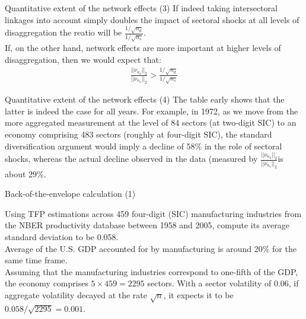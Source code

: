 \documentclass[dvipsnames]{beamer}
\begin{document}
\begin{frame}{Quantitative extent of the network effects (3)}
    \justifying
    If indeed taking intersectoral linkages into account
    simply doubles the impact of sectoral shocks at all levels of disaggregation
    the reatio will be  $\frac{1/\sqrt{n_d}}{1/\sqrt{n_s}}$.\\[5pt]

    If, on the other hand, network effects are more important at higher 
    levels of disaggregation, then we would expect that:
    \begin{align*}
        \frac{||\nu_{n_d}||_2}{||\nu_{n_s}||_2}>\frac{1/\sqrt{n_d}}{1/\sqrt{n_s}}
    \end{align*}


\end{frame}
\begin{frame}{Quantitative extent of the network effects (4)}
    \justifying
    The table early shows that the latter is indeed the case for all years. 
    For example, in 1972, as we move
    from the more aggregated measurement at the level of 84 sectors (at two-digit
    SIC) to an economy comprising 483 sectors (roughly at four-digit SIC), the
    standard diversification argument would imply a decline of 58\% in the role of
    sectoral shocks, whereas the actual decline observed in the data (measured by
    $\frac{||\nu_{n_d}||_2}{||\nu_{n_s}||_2}$is about 29\%.
    
\end{frame}









\begin{frame}{Back-of-the-envelope calculation (1)}
    \justifying


    Using TFP estimations across 459 four-digit (SIC) manufacturing industries
    from the NBER productivity database between 1958 and 2005, compute
    its average standard deviation to be 0.058.\\[5pt]

    Average of the U.S. GDP accounted for by manufacturing is around 20\% for the 
    same time frame.\\[5pt]

Assuming that the manufacturing industries 
correspond to one-fifth of the GDP, the economy comprises $5 × 459 = 2295$ 
sectors. With a sector volatility of 0.06, if aggregate volatility decayed at
the rate $\sqrt{n}$, it expects it to be $0.058 / \sqrt{2295}=0.001$.\\[5pt]

\end{frame}
\end{document}
